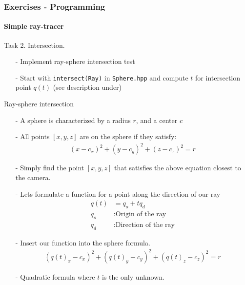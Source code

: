 \documentclass[8pt]{beamer}
\begin{document}
	\begin{frame}[fragile]
	\frametitle{Exercises - Programming}
	\framesubtitle{Simple ray-tracer}
	Task 2. Intersection.
	\begin{enumerate}
	\item[-] Implement ray-sphere intersection test
	\item[-] Start with \verb|intersect(Ray)| in \verb|Sphere.hpp| and compute $t$ for intersection point $q(t)$ (see description under)
	\end{enumerate}
	Ray-sphere intersection
	\begin{enumerate}
	\item[-] A sphere is characterized by a radius $r$, and a center $c$
	\item[-] All points $[x,y,z]$ are on the sphere if they satisfy: 
	\begin{align*}
	(x-c_x)^2+(y-c_y)^2+(z-c_z)^2 = r
	\end{align*}
	\item[-] Simply find the point $[x, y, z]$ that satisfies the above equation closest to the camera.
	\item[-] Lets formulate a function for a point along the direction of our ray
	\begin{align*}
	q(t)&=q_o+tq_d\\
	q_o&:\text{Origin of the ray}\\
	q_d&:\text{Direction of the ray}
	\end{align*}
	\item[-] Insert our function into the sphere formula.
	\begin{align*}
	(q(t)_x-c_x)^2+(q(t)_y-c_y)^2+(q(t)_z-c_z)^2 = r
	\end{align*}
	\item[-] Quadratic formula where $t$ is the only unknown.
	\end{enumerate}
	
	\end{frame}
	
\end{document}
